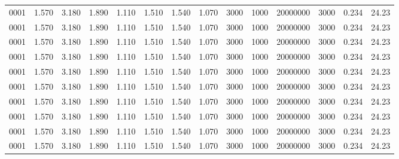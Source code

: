 \documentclass[paper=a4, parskip, fontsize=11pt]{scrartcl}
\begin{document}
\begin{center}
\begin{longtable}{lrrrrrrrrrrrrr}
    		0001 &    1.570 &    3.180 & 1.890 &    1.110 &    1.510 &    1.540 &    1.070 &   3000  & 1000 &  20000000 & 3000 & 0.234 & 24.23 \\
    		0001 &    1.570 &    3.180 & 1.890 &    1.110 &    1.510 &    1.540 &    1.070 &   3000  & 1000 &  20000000 & 3000 & 0.234 & 24.23 \\
    		0001 &    1.570 &    3.180 & 1.890 &    1.110 &    1.510 &    1.540 &    1.070 &   3000  & 1000 &  20000000 & 3000 & 0.234 & 24.23 \\
    		0001 &    1.570 &    3.180 & 1.890 &    1.110 &    1.510 &    1.540 &    1.070 &   3000  & 1000 &  20000000 & 3000 & 0.234 & 24.23 \\
    		0001 &    1.570 &    3.180 & 1.890 &    1.110 &    1.510 &    1.540 &    1.070 &   3000  & 1000 &  20000000 & 3000 & 0.234 & 24.23 \\
    		0001 &    1.570 &    3.180 & 1.890 &    1.110 &    1.510 &    1.540 &    1.070 &   3000  & 1000 &  20000000 & 3000 & 0.234 & 24.23 \\
    		0001 &    1.570 &    3.180 & 1.890 &    1.110 &    1.510 &    1.540 &    1.070 &   3000  & 1000 &  20000000 & 3000 & 0.234 & 24.23 \\
    		0001 &    1.570 &    3.180 & 1.890 &    1.110 &    1.510 &    1.540 &    1.070 &   3000  & 1000 &  20000000 & 3000 & 0.234 & 24.23 \\
    		0001 &    1.570 &    3.180 & 1.890 &    1.110 &    1.510 &    1.540 &    1.070 &   3000  & 1000 &  20000000 & 3000 & 0.234 & 24.23 \\
    		0001 &    1.570 &    3.180 & 1.890 &    1.110 &    1.510 &    1.540 &    1.070 &   3000  & 1000 &  20000000 & 3000 & 0.234 & 24.23 \\
    	\end{longtable}
    \end{center}
\end{document}
